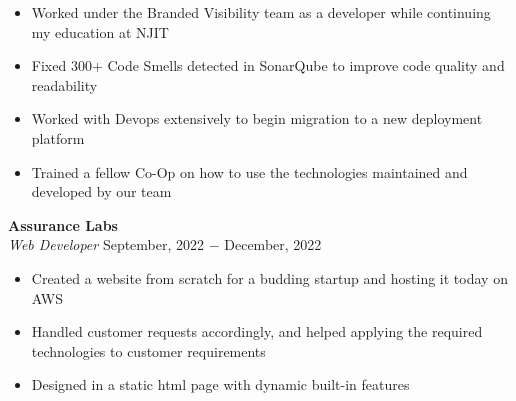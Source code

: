 \documentclass{article}
\begin{document}
\begin{itemize}[noitemsep,nolistsep,leftmargin=*]
\item {Worked under the Branded Visibility team as a developer while continuing my education at NJIT}
\item {Fixed 300+ Code Smells detected in SonarQube to improve code quality and readability}
\item {Worked with Devops extensively to begin migration to a new deployment platform}
\item {Trained a fellow Co-Op on how to use the technologies maintained and developed by our team}\\
\end{itemize}

\noindent \textbf{Assurance Labs} \\
\textit{Web Developer} \hfill September, 2022 $-$ December, 2022
\begin{itemize}[noitemsep,nolistsep,leftmargin=*]
\item {Created a website from scratch for a budding startup and hosting it today on AWS}
\item {Handled customer requests accordingly, and helped applying the required technologies to customer requirements}
\item {Designed in a static html page with dynamic built-in features\\}
\end{itemize}



\end{document}
